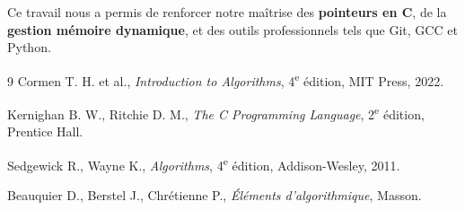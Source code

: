 \documentclass[12pt, a4paper]{article}
\begin{document}
Ce travail nous a permis de renforcer notre maîtrise des 
\textbf{pointeurs en C}, de la \textbf{gestion mémoire dynamique}, 
et des outils professionnels tels que Git, GCC et Python.

\begin{thebibliography}{9}
Cormen T. H. et al.,
\textit{Introduction to Algorithms},
4\textsuperscript{e} édition, MIT Press, 2022.

Kernighan B. W., Ritchie D. M.,
\textit{The C Programming Language},
2\textsuperscript{e} édition, Prentice Hall.

Sedgewick R., Wayne K.,
\textit{Algorithms}, 4\textsuperscript{e} édition,
Addison-Wesley, 2011.

Beauquier D., Berstel J., Chrétienne P.,
\textit{Éléments d'algorithmique}, Masson.
\end{thebibliography}
\end{document}
